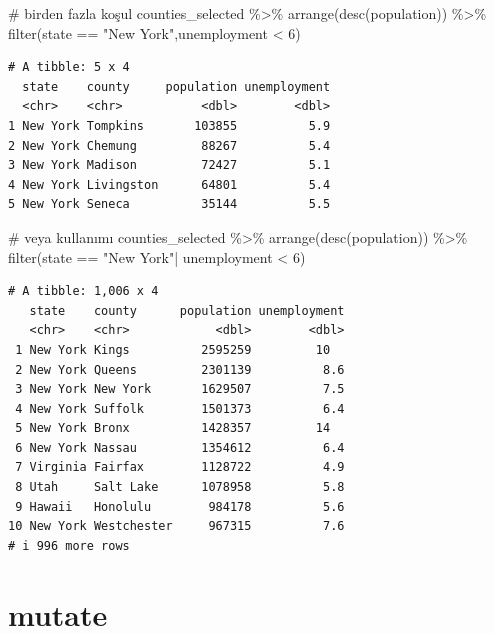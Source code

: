 \documentclass[
  letterpaper,
  DIV=11,
  numbers=noendperiod]{scrreprt}
\newenvironment{Shaded}{\begin{snugshade}}{\end{snugshade}}
\newcommand{\CommentTok}[1]{\textcolor[rgb]{0.37,0.37,0.37}{#1}}
\newcommand{\DecValTok}[1]{\textcolor[rgb]{0.68,0.00,0.00}{#1}}
\newcommand{\FunctionTok}[1]{\textcolor[rgb]{0.28,0.35,0.67}{#1}}
\newcommand{\NormalTok}[1]{\textcolor[rgb]{0.00,0.23,0.31}{#1}}
\newcommand{\SpecialCharTok}[1]{\textcolor[rgb]{0.37,0.37,0.37}{#1}}
\newcommand{\StringTok}[1]{\textcolor[rgb]{0.13,0.47,0.30}{#1}}
\begin{document}
\begin{Shaded}
\begin{Highlighting}[]
\CommentTok{\# birden fazla koşul}
\NormalTok{counties\_selected }\SpecialCharTok{\%\textgreater{}\%}
\FunctionTok{arrange}\NormalTok{(}\FunctionTok{desc}\NormalTok{(population)) }\SpecialCharTok{\%\textgreater{}\%}
\FunctionTok{filter}\NormalTok{(state }\SpecialCharTok{==} \StringTok{"New York"}\NormalTok{,unemployment }\SpecialCharTok{\textless{}} \DecValTok{6}\NormalTok{)}
\end{Highlighting}
\end{Shaded}

\begin{verbatim}
# A tibble: 5 x 4
  state    county     population unemployment
  <chr>    <chr>           <dbl>        <dbl>
1 New York Tompkins       103855          5.9
2 New York Chemung         88267          5.4
3 New York Madison         72427          5.1
4 New York Livingston      64801          5.4
5 New York Seneca          35144          5.5
\end{verbatim}

\begin{Shaded}
\begin{Highlighting}[]
\CommentTok{\# veya kullanımı}
\NormalTok{counties\_selected }\SpecialCharTok{\%\textgreater{}\%}
\FunctionTok{arrange}\NormalTok{(}\FunctionTok{desc}\NormalTok{(population)) }\SpecialCharTok{\%\textgreater{}\%}
\FunctionTok{filter}\NormalTok{(state }\SpecialCharTok{==} \StringTok{"New York"}\SpecialCharTok{|}\NormalTok{ unemployment }\SpecialCharTok{\textless{}} \DecValTok{6}\NormalTok{)}
\end{Highlighting}
\end{Shaded}

\begin{verbatim}
# A tibble: 1,006 x 4
   state    county      population unemployment
   <chr>    <chr>            <dbl>        <dbl>
 1 New York Kings          2595259         10  
 2 New York Queens         2301139          8.6
 3 New York New York       1629507          7.5
 4 New York Suffolk        1501373          6.4
 5 New York Bronx          1428357         14  
 6 New York Nassau         1354612          6.4
 7 Virginia Fairfax        1128722          4.9
 8 Utah     Salt Lake      1078958          5.8
 9 Hawaii   Honolulu        984178          5.6
10 New York Westchester     967315          7.6
# i 996 more rows
\end{verbatim}

\hypertarget{mutate}{%
\section*{mutate}\label{mutate}}
\end{document}
